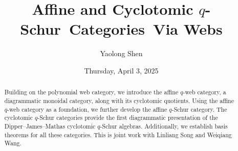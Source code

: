 \documentclass{UAmathtalk}
\author{Yaolong Shen}
\title{Affine and Cyclotomic $q$-Schur~Categories~Via Webs}
\date{Thursday, April 3, 2025}
\begin{document}
\maketitle

\begin{abstract}
Building on the polynomial web category, we introduce the affine $q$-web category, a diagrammatic monoidal category, along with its cyclotomic quotients. Using the affine $q$-web category as a foundation, we further develop the affine $q$-Schur category. The cyclotomic $q$-Schur categories provide the first diagrammatic presentation of the Dipper--James--Mathas cyclotomic $q$-Schur algebras. Additionally, we establish basis theorems for all these categories. This is joint work with Linliang Song and Weiqiang Wang.
\end{abstract}
\end{document}
